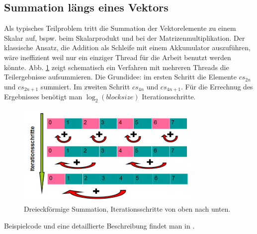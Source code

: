 


\subsection{Summation längs eines Vektors}

Als typisches Teilproblem tritt die Summation der Vektorelemente zu
einem Skalar auf, bspw. beim Skalarprodukt und bei der Matrizenmultiplikation.
Der klassische Ansatz, die Addition als Schleife mit einem Akkumulator
auszuführen, wäre ineffizient weil nur ein einziger Thread für die
Arbeit benutzt werden könnte.
Abb. \ref{Dreieck} zeigt schematisch ein Verfahren mit mehreren Threads
die Teilergebnisse aufsummieren.
Die Grundidee: im ersten Schritt die Elemente
$cs_{2n}$ und $cs_{2n+1}$ summiert.
Im zweiten Schritt $cs_{4n}$ und $cs_{4n+1}$. Für die Errechnug
des Ergebnisses benötigt man $ \log_2(blocksize)$ Iterationsschritte.

\begin{figure}[htbp]
\includegraphics[width=3.5in]{../xby/pic//dreieck}
\caption{\label{Dreieck}Dreieckförmige Summation, Iterationsschritte von oben nach unten.}
\end{figure}

Beispielcode und eine detaillierte Beschreibung findet man in \cite{reduction}.

%
